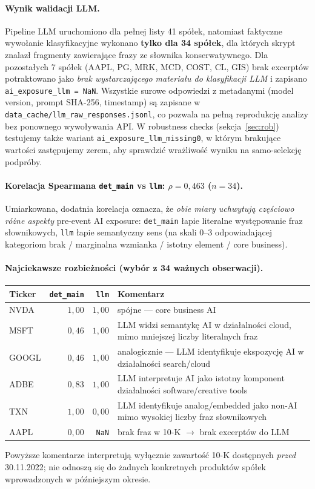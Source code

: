 \documentclass[11pt,a4paper]{article}
\begin{document}
\paragraph{Wynik walidacji LLM.}
Pipeline LLM uruchomiono dla pełnej listy 41 spółek, natomiast faktyczne
wywołanie klasyfikacyjne wykonano \textbf{tylko dla 34 spółek}, dla których
skrypt znalazł fragmenty zawierające frazy ze słownika konserwatywnego.
Dla pozostałych 7 spółek (AAPL, PG, MRK, MCD, COST, CL, GIS) brak excerptów
potraktowano jako \emph{brak wystarczającego materiału do klasyfikacji LLM}
i zapisano \texttt{ai\_exposure\_llm = NaN}. Wszystkie surowe odpowiedzi
z metadanymi (model version, prompt SHA-256, timestamp) są zapisane w
\texttt{data\_cache/llm\_raw\_responses.jsonl}, co pozwala na pełną reprodukcję
analizy bez ponownego wywoływania API. W robustness checks
(sekcja~\ref{sec:rob}) testujemy także wariant \texttt{ai\_exposure\_llm\_missing0},
w którym brakujące wartości zastępujemy zerem, aby sprawdzić wrażliwość wyniku
na samo-selekcję podpróby.

\paragraph{Korelacja Spearmana \texttt{det\_main} vs \texttt{llm}: $\rho = 0{,}463$ ($n = 34$).}
Umiarkowana, dodatnia korelacja oznacza, że \emph{obie miary uchwytują
częściowo różne aspekty} pre-event AI exposure: \texttt{det\_main} łapie literalne
występowanie fraz słownikowych, \texttt{llm} łapie semantyczny sens (na skali
0--3 odpowiadającej kategoriom brak / marginalna wzmianka / istotny element /
core business).

\paragraph{Najciekawsze rozbieżności (wybór z 34 ważnych obserwacji).}
\begin{center}\small
\begin{tabular}{p{1.2cm}rrp{8.5cm}}
\toprule
Ticker & \texttt{det\_main} & \texttt{llm} & Komentarz \\
\midrule
NVDA  & $1{,}00$ & $1{,}00$ & spójne --- core business AI \\
MSFT  & $0{,}46$ & $1{,}00$ & LLM widzi semantykę AI w działalności cloud, mimo mniejszej liczby literalnych fraz \\
GOOGL & $0{,}46$ & $1{,}00$ & analogicznie --- LLM identyfikuje ekspozycję AI w działalności search/cloud \\
ADBE  & $0{,}83$ & $1{,}00$ & LLM interpretuje AI jako istotny komponent działalności software/creative tools \\
TXN   & $1{,}00$ & $0{,}00$ & LLM identyfikuje analog/embedded jako non-AI mimo wysokiej liczby fraz słownikowych \\
AAPL  & $0{,}00$ & \texttt{NaN} & brak fraz w 10-K $\rightarrow$ brak excerptów do LLM \\
\bottomrule
\end{tabular}
\end{center}
\smallskip
Powyższe komentarze interpretują wyłącznie zawartość 10-K dostępnych
\emph{przed} 30.11.2022; nie odnoszą się do żadnych konkretnych produktów
spółek wprowadzonych w późniejszym okresie.
\end{document}
